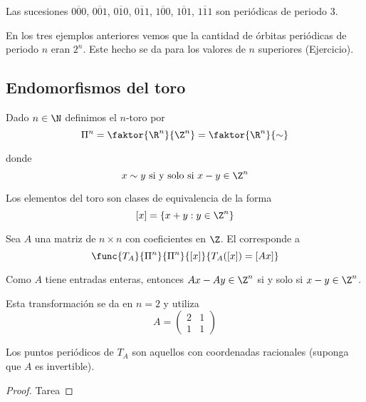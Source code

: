 \documentclass[	docname= Sistemas\ Din\'amicos,
				finished=1,
				semester=1,
				year=2017,
				professor=Godofredo\ Iommi,
				sigla=MAT2565]{apunte}
\begin{document}
\begin{ex} Las sucesiones $\overline{000}$, $\overline{001}$, $\overline{010}$, $\overline{011}$, $\overline{100}$, $\overline{101}$, $\overline{111}$ son periódicas de periodo 3.
\end{ex}

En los tres ejemplos anteriores vemos que la cantidad de órbitas periódicas de periodo $n$ eran $2^{n}$. Este hecho se da para los valores de $n$ superiores (Ejercicio).

\subsection{Endomorfismos del toro}
Dado $n \in \N$ definimos el $n$-toro por
	$$\Pi^{n} = \faktor{\R^{n}}{\Z^{n}} = \faktor{\R^{n}}{\sim}$$ 

donde
	$$x \sim y \text{ si y solo si } x-y \in \Z^{n}$$

Los elementos del toro son clases de equivalencia de la forma
	$$[x] = \{x+y : y \in \Z^{n}\}$$

\begin{defn} Sea $A$ una matriz de $n \times n$ con coeficientes en $\Z$. El  corresponde a
	 $$\func{T_{A}}{\Pi^{n}}{\Pi^{n}}
	 			{[x]}{T_{A}([x]) = [Ax]}$$
\end{defn}

\begin{obsd} Como $A$ tiene entradas enteras, entonces $Ax - Ay \in \Z^{n}$ si y solo si $x-y \in \Z^{n}$.
\end{obsd}

\begin{ej} Esta transformación se da en $n = 2$ y utiliza
	$$A = \begin{pmatrix}
			2	&	1	\\
			1	&	1
	\end{pmatrix}$$
\end{ej}

\begin{prop} Los puntos periódicos de $T_{A}$ son aquellos con coordenadas racionales (suponga que $A$ es invertible).
\end{prop}

\begin{proof} Tarea
\end{proof}

\end{document}
